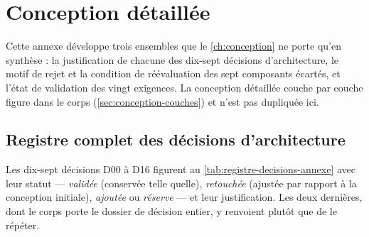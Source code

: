 \chapter{Conception détaillée}
\label{ann:conception-detaillee}

Cette annexe développe trois ensembles que le \cref{ch:conception} ne porte qu'en
synthèse : la justification de chacune des dix-sept décisions d'architecture, le motif de rejet et
la condition de réévaluation des sept composants écartés, et l'état de validation des vingt
exigences. La conception détaillée couche par couche figure dans le corps
(\cref{sec:conception-couches}) et n'est pas dupliquée ici.

\section{Registre complet des décisions d'architecture}
\label{ann:registre-decisions}

Les dix-sept décisions D00 à D16 figurent au \cref{tab:registre-decisions-annexe} avec leur statut
--- \emph{validée} (conservée telle quelle), \emph{retouchée} (ajustée par rapport à la conception
initiale), \emph{ajoutée} ou \emph{réserve} --- et leur justification. Les deux dernières, dont le
corps porte le dossier de décision entier, y renvoient plutôt que de le répéter.

